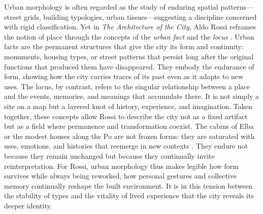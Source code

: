 \documentclass[land,article,accept,pdftex,oneauthor]{Definitions/mdpi}
\begin{document}
Urban morphology is often regarded as the study of enduring spatial patterns---street grids, building typologies, urban tissues---suggesting a discipline concerned with rigid classification. Yet in \textit{{The Architecture of the City}}, Aldo Rossi reframes the notion of place through the concepts of the \textit{{urban fact}} and the \textit{{locus}} \cite{rossi_architecture_1982}. Urban facts are the permanent structures that give the city its form and continuity: monuments, housing types, or street patterns that persist long after the original functions that produced them have disappeared. They embody the endurance of form, showing how the city carries traces of its past even as it adapts to new uses. The locus, by contrast, refers to the singular relationship between a place and the events, memories, and meanings that accumulate there. It is not simply a site on a map but a layered knot of history, experience, and imagination. Taken together, these concepts allow Rossi to describe the city not as a fixed artifact but as a field where permanence and transformation coexist. The cabins of Elba or the modest houses along the Po are not frozen forms: they are saturated with uses, emotions, and histories that reemerge in new  {contexts}  %
\cite{rossi_scientific_1981}. They endure not because they remain unchanged but because they continually invite reinterpretation. For Rossi, urban morphology thus makes legible how form survives while always being reworked, how personal gestures and collective memory continually reshape the built environment. It is in this tension between the stability of types and the vitality of lived experience that the city reveals its deeper identity.
\end{document}
